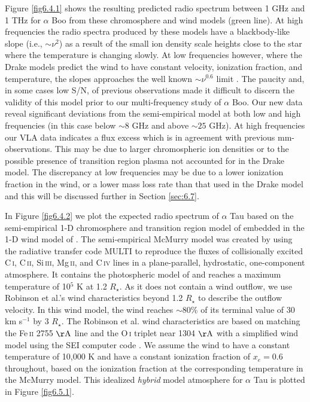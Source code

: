 Figure \ref{fig6.4.1} shows the resulting predicted radio spectrum between 1 GHz and 1 THz for $\alpha$ Boo from these chromosphere and wind models (green line). At high frequencies the radio spectra produced by these models have a blackbody-like slope (i.e., $\sim \nu ^{2}$) as a result of the small ion density scale heights close to the star where the temperature is changing slowly. At low frequencies however, where the Drake models predict the wind to have constant velocity, ionization fraction, and temperature, the slopes approaches the well known $\sim\nu ^{0.6}$ limit \citep{wright_1975,olnon_1975,panagia_1975}. The paucity and, in some cases low S/N, of previous observations made it difficult to discern the validity of this model prior to our multi-frequency study of $\alpha$ Boo. Our new data reveal significant deviations from the semi-empirical model at both low and high frequencies (in this case below $\sim 8$ GHz and above $\sim 25$ GHz). At high frequencies our VLA data indicates a flux excess which is in agreement with previous mm-observations. This may be due to larger chromospheric ion densities or to the possible presence of transition region plasma not accounted for in the Drake model. The discrepancy at low frequencies may be due to a lower ionization fraction in the wind, or a lower mass loss rate than that used in the Drake model and this will be discussed further in Section \ref{sec:6.7}.

In Figure \ref{fig6.4.2} we plot the expected radio spectrum of $\alpha$ Tau based on the semi-empirical 1-D chromosphere and transition region model of \cite{mcmurry_1999} embedded in the 1-D wind model of \cite{robinson_1998}. The semi-empirical McMurry model was created by using the radiative transfer code MULTI \citep{carlsson_1986} to reproduce the fluxes of collisionally excited C\,\textsc{i}, C\,\textsc{ii}, Si\,\textsc{iii}, Mg\,\textsc{ii}, and C\,\textsc{iv} lines in a plane-parallel, hydrostatic, one-component atmosphere. It contains the photospheric model of \cite{johnson_1973} and reaches a maximum temperature of 10$^{5}$ K at 1.2 $R_{\star}$. As it does not contain a wind outflow, we use Robinson et al.'s wind characteristics beyond 1.2 $R_{\star}$ to describe the outflow velocity. In this wind model, the wind reaches $\sim$80\% of its terminal value of 30 km s$^{-1}$ by 3 $R_{\star}$. The Robinson et al. wind characteristics are based on matching the Fe\,\textsc{ii} 2755 $\rm{\AA}$ line and the O\,\textsc{i} triplet near 1304 $\rm{\AA}$ with a simplified wind model using the SEI computer code \citep{lamers_1987}. We assume the wind to have a constant temperature of 10,000 K and have a constant ionization fraction of $x_{e} = 0.6$ throughout, based on the ionization fraction at the corresponding temperature in the McMurry model. This idealized \textit{hybrid} model atmosphere for $\alpha$ Tau is plotted in Figure \ref{fig6.5.1}.

